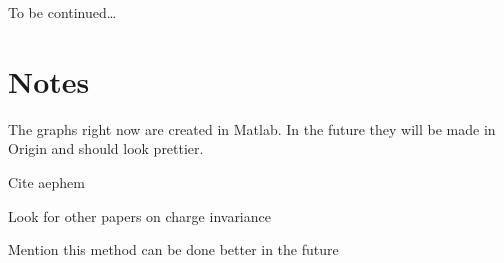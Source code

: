 \documentclass[superscriptaddress,aps,prb,11pt]{revtex4-1}
\begin{document}
\begin{acknowledgments}
To be continued\ldots
\end{acknowledgments}

\section{Notes}
The graphs right now are created in Matlab.  In the future they will be made in Origin and should look prettier.

Cite aephem

Look for other papers on charge invariance

Mention this method can be done better in the future



\end{document}
